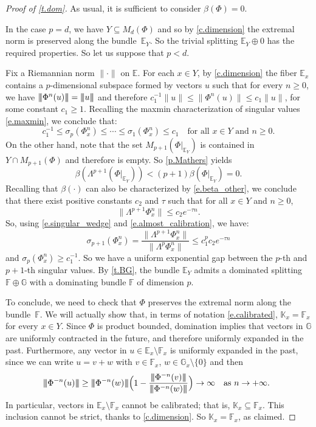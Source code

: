 \documentclass[JEP,XML,SOM,Unicode]{cedram}
\theoremstyle{plain}
\theoremstyle{definition}
\newcommand{\tribar}[1]{\mathopen{| {\kern -1.5pt} | {\kern -1.5pt} |} {#1}
\mathclose{| {\kern -1.5pt} | {\kern -1.5pt} |}}
\newcommand{\EE}{\mathbb{E}}
\newcommand{\FF}{\mathbb{F}}
\newcommand{\GG}{\mathbb{G}}
\newcommand{\KK}{\mathbb{K}}
\newcommand{\WEDGE}{\mathsf{\Lambda}}
\begin{document}
\begin{proof}[Proof of \cref{t.dom}]
As usual, it is sufficient to consider $\beta(\Phi) = 0$.

In the case $p=d$, we have $Y \subseteq M_d(\Phi)$ and so by \cref{c.dimension} the extremal norm is preserved along the bundle~$\EE_Y$. So the trivial splitting $\EE_Y \oplus 0$ has the required properties.
So let us suppose that $p<d$.

Fix a Riemannian norm $\| \mathord{\cdot} \|$ on $\EE$.
For each $x \in Y$, by \cref{c.dimension} the fiber $\EE_x$ contains a $p$-dimensional subspace formed by vectors $u$ such that for every $n \ge 0$, we have $\tribar{\Phi^n(u)} = \tribar{u}$ and therefore
$c_1^{-1} \|u\| \le \| \Phi^n(u) \| \le c_1 \|u\|$, for some constant $c_1 \ge 1$.
Recalling the maxmin characterization of singular values \eqref{e.maxmin}, we conclude that:
\begin{equation}\label{e.almost_calibration}
c_1^{-1} \le \sigma_p(\Phi^n_x) \le \cdots \le \sigma_1(\Phi^n_x) \le c_1 \quad \text{for all $x \in Y$ and $n \ge 0$.}
\end{equation}
On the other hand, note that the set $M_{p+1} (\Phi|_{\EE_Y})$ is contained in $Y \cap M_{p+1}(\Phi)$ and therefore is empty.
So \cref{p.Mathers} yields
\[
\beta \left( \WEDGE^{p+1} (\Phi|_{\EE_Y}) \right) < (p+1) \beta(\Phi|_{\EE_Y}) = 0.
\]
Recalling that $\beta(\mathord{\cdot})$ can also be characterized by \eqref{e.beta_other}, we conclude that there exist positive constants $c_2$ and $\tau$ such that for all $x \in Y$ and $n \ge 0$,
\[
\| \WEDGE^{p+1} \Phi^n_x \| \le c_2 e^{-\tau n}.
\]
So, using \eqref{e.singular_wedge} and \eqref{e.almost_calibration}, we have:
\[
\sigma_{p+1} (\Phi^n_x) = \frac{\| \WEDGE^{p+1} \Phi^n_x \|}{\| \WEDGE^p \Phi^n_x \|} \le c_1^p c_2 e^{-\tau n}
\]
and $\sigma_p (\Phi^n_x) \ge c_1^{-1}$.
So we have a uniform exponential gap between the $p$-th and $p+1$-th singular values.
By \cref{t.BG}, the bundle $\EE_Y$ admits a dominated splitting $\FF \oplus \GG$ with a dominating bundle $\FF$ of dimension $p$.

To conclude, we need to check that $\Phi$ preserves the extremal norm along the bundle~$\FF$.
We will actually show that, in terms of notation \eqref{e.calibrated}, $\KK_x = \FF_x$ for every $x \in Y$.
Since $\Phi$ is product bounded, domination implies that vectors in $\GG$ are uniformly contracted in the future, and therefore uniformly expanded in the past.
Furthermore, any vector in $u \in \EE_x \setminus \FF_x$ is uniformly expanded in the past, since we can write $u = v + w$ with $v \in \FF_x$, $w \in \GG_x \setminus \{0\}$ and then
\[
\tribar{\Phi^{-n}(u)} \ge \tribar{\Phi^{-n}(w)} \Bigl( 1 - \frac{\tribar{\Phi^{-n}(v)}}{\tribar{\Phi^{-n}(w)}} \Bigr) \to \infty \quad \text{as $n \to +\infty$. }
\]
In particular, vectors in $\EE_x \setminus \FF_x$ cannot be calibrated; that is, $\KK_x \subseteq \FF_x$. This inclusion cannot be strict, thanks to \cref{c.dimension}.
So $\KK_x = \FF_x$, as claimed.
\end{proof}
\end{document}
